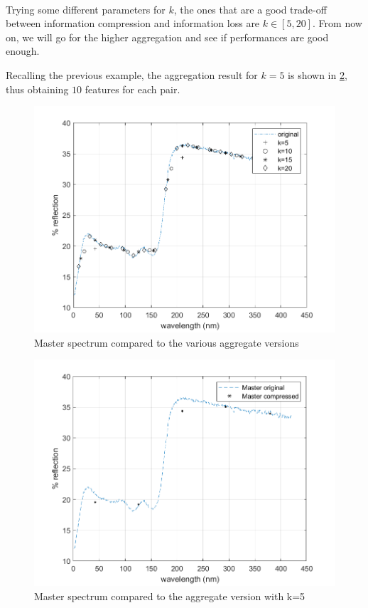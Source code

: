 \documentclass[twocolumn,a4paper]{article}
\begin{document}
\paragraph{} Trying some different parameters for $k$, the ones that are a good trade-off between information compression and information loss are $k \in [5,20]$. From now on, we will go for the higher aggregation and see if performances are good enough.

Recalling the previous example, the aggregation result for $k=5$ is shown in \ref{fig:master_subsmpl}, thus obtaining $10$ features for each pair.
\begin{figure}
    \centering
    \includegraphics[width=\linewidth]{images/120_5_5_20_masterSub.png}
    \caption{Master spectrum compared to the various aggregate versions}
    \label{fig:master_subsmplmul}
\end{figure}

\begin{figure}
    \centering
    \includegraphics[width=\linewidth]{images/A_5_120_masterSub.png}
    \caption{Master spectrum compared to the aggregate version with k=5}
    \label{fig:master_subsmpl}
\end{figure}
\end{document}
